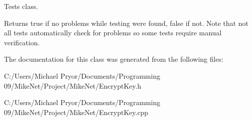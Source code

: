 Tests class. 

\begin{DoxyReturn}{Returns}
true if no problems while testing were found, false if not. Note that not all tests automatically check for problems so some tests require manual verification. 
\end{DoxyReturn}


The documentation for this class was generated from the following files:\begin{DoxyCompactItemize}
\item 
C:/Users/Michael Pryor/Documents/Programming 09/MikeNet/Project/MikeNet/EncryptKey.h\item 
C:/Users/Michael Pryor/Documents/Programming 09/MikeNet/Project/MikeNet/EncryptKey.cpp\end{DoxyCompactItemize}
